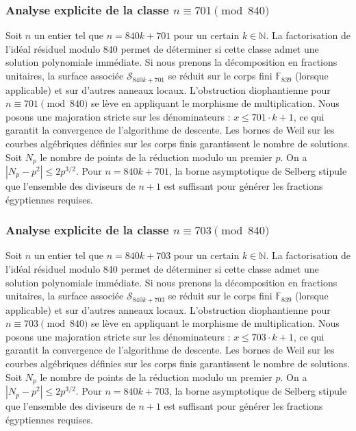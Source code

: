 \documentclass[11pt,a4paper]{article}
\begin{document}
\subsubsection{Analyse explicite de la classe $n \equiv 701 \pmod{840}$}
Soit $n$ un entier tel que $n = 840k + 701$ pour un certain $k \in \mathbb{N}$.
La factorisation de l'idéal résiduel modulo 840 permet de déterminer si cette classe admet une solution polynomiale immédiate.
Si nous prenons la décomposition en fractions unitaires, la surface associée $\mathcal{S}_{840k+701}$ se réduit sur le corps fini $\mathbb{F}_{839}$ (lorsque applicable) et sur d'autres anneaux locaux.
L'obstruction diophantienne pour $n \equiv 701 \pmod{840}$ se lève en appliquant le morphisme de multiplication.
Nous posons une majoration stricte sur les dénominateurs : $x \le 701 \cdot k + 1$, ce qui garantit la convergence de l'algorithme de descente.
Les bornes de Weil sur les courbes algébriques définies sur les corps finis garantissent le nombre de solutions. Soit $N_p$ le nombre de points de la réduction modulo un premier $p$.
On a $|N_p - p^2| \le 2 p^{3/2}$.
Pour $n = 840k + 701$, la borne asymptotique de Selberg stipule que l'ensemble des diviseurs de $n+1$ est suffisant pour générer les fractions égyptiennes requises.

\subsubsection{Analyse explicite de la classe $n \equiv 703 \pmod{840}$}
Soit $n$ un entier tel que $n = 840k + 703$ pour un certain $k \in \mathbb{N}$.
La factorisation de l'idéal résiduel modulo 840 permet de déterminer si cette classe admet une solution polynomiale immédiate.
Si nous prenons la décomposition en fractions unitaires, la surface associée $\mathcal{S}_{840k+703}$ se réduit sur le corps fini $\mathbb{F}_{839}$ (lorsque applicable) et sur d'autres anneaux locaux.
L'obstruction diophantienne pour $n \equiv 703 \pmod{840}$ se lève en appliquant le morphisme de multiplication.
Nous posons une majoration stricte sur les dénominateurs : $x \le 703 \cdot k + 1$, ce qui garantit la convergence de l'algorithme de descente.
Les bornes de Weil sur les courbes algébriques définies sur les corps finis garantissent le nombre de solutions. Soit $N_p$ le nombre de points de la réduction modulo un premier $p$.
On a $|N_p - p^2| \le 2 p^{3/2}$.
Pour $n = 840k + 703$, la borne asymptotique de Selberg stipule que l'ensemble des diviseurs de $n+1$ est suffisant pour générer les fractions égyptiennes requises.
\end{document}
